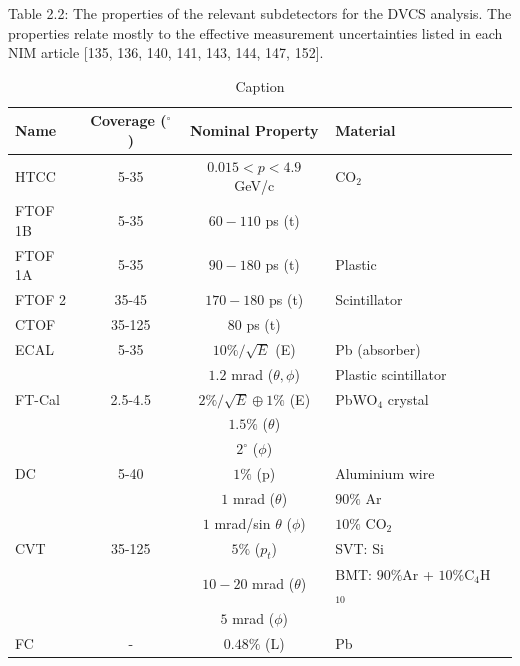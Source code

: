     Table 2.2: The properties of the relevant subdetectors for the DVCS analysis. The
    properties relate mostly to the effective measurement uncertainties listed in each NIM
    article [135, 136, 140, 141, 143, 144, 147, 152].
    
    \begin{table}[ht]
        \centering
        \begin{tabularx}{\textwidth}{XccXX}
        \toprule
        Name & Coverage ($^\circ$) & Nominal Property & Material \\
        \midrule
        HTCC & 5-35 & $0.015 < p < 4.9$ GeV/c & CO$_2$ \\
        FTOF 1B & 5-35 & $60 - 110$ ps (t) & \\
        FTOF 1A & 5-35 & $90 - 180$ ps (t) & Plastic \\
        FTOF 2 & 35-45 & $170 - 180$ ps (t) & Scintillator \\
        CTOF & 35-125 & $80$ ps (t) & \\
        ECAL & 5-35 & $10\%/\sqrt{E}$ (E) & Pb (absorber) \\
        & & $1.2$ mrad ($\theta, \phi$) & Plastic scintillator \\
        FT-Cal & 2.5-4.5 & $2\%/\sqrt{E} \oplus 1\%$ (E) & PbWO$_4$ crystal \\
        & & $1.5\%$ ($\theta$) & \\
        & & $2^\circ$ ($\phi$) & \\
        DC & 5-40 & $1\%$ (p) & Aluminium wire \\
        & & $1$ mrad ($\theta$) & $90\%$ Ar \\
        & & $1$ mrad/sin $\theta$ ($\phi$) & $10\%$ CO$_2$ \\
        CVT & 35-125 & $5\%$ ($p_t$) & SVT: Si \\
        & & $10 - 20$ mrad ($\theta$) & BMT: $90\%$Ar + $10\%$C$_4$H$_{10}$ \\
        & & $5$ mrad ($\phi$) & \\
        FC & - & $0.48\%$ (L) & Pb \\
        \bottomrule
        \end{tabularx}
        \caption{Caption}
        \label{tab:my_label}
    \end{table}


\fi

